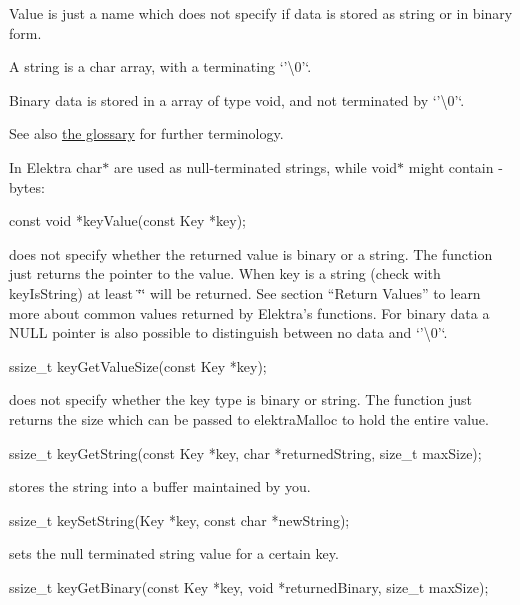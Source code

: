 \begin{DoxyItemize}
\item Value is just a name which does not specify if data is stored as string or in binary form.
\item A string is a char array, with a terminating `'\textbackslash{}0'`.
\item Binary data is stored in a array of type void, and not terminated by `'\textbackslash{}0'`.
\end{DoxyItemize}

See also \hyperlink{md_doc_help_elektra-glossary_doc_help_elektra-glossary_md}{the glossary} for further terminology.

In Elektra {\ttfamily char$\ast$} are used as null-\/terminated strings, while {\ttfamily void$\ast$} might contain {}-\/bytes\+: \begin{DoxyVerb}    const void *keyValue(const Key *key);
\end{DoxyVerb}


does not specify whether the returned value is binary or a string. The function just returns the pointer to the value. When {\ttfamily key} is a string (check with {\ttfamily key\+Is\+String}) at least {\ttfamily \char`\"{}\char`\"{}} will be returned. See section “\+Return Values” to learn more about common values returned by Elektra's functions. For binary data a {\ttfamily N\+U\+L\+L} pointer is also possible to distinguish between no data and `'\textbackslash{}0'`. \begin{DoxyVerb}    ssize_t keyGetValueSize(const Key *key);
\end{DoxyVerb}


does not specify whether the key type is binary or string. The function just returns the size which can be passed to {\ttfamily elektra\+Malloc} to hold the entire value. \begin{DoxyVerb}    ssize_t keyGetString(const Key *key, char *returnedString, size_t maxSize);
\end{DoxyVerb}


stores the string into a buffer maintained by you. \begin{DoxyVerb}    ssize_t keySetString(Key *key, const char *newString);
\end{DoxyVerb}


sets the null terminated string value for a certain key. \begin{DoxyVerb}    ssize_t keyGetBinary(const Key *key, void *returnedBinary, size_t maxSize);
\end{DoxyVerb}



